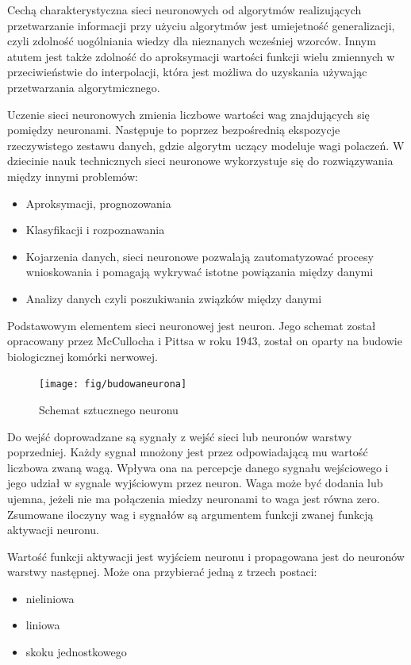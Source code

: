 \documentclass[brudnopis]{xmgr}
\begin{document}
Cechą charakterystyczna sieci neuronowych od algorytmów realizujących przetwarzanie informacji przy użyciu algorytmów jest umiejetność generalizacji, czyli zdolność uogólniania wiedzy dla nieznanych wcześniej wzorców. Innym atutem jest także zdolność do aproksymacji wartości funkcji wielu zmiennych w przeciwieństwie do interpolacji, która jest możliwa do uzyskania używając przetwarzania algorytmicznego.

Uczenie sieci neuronowych zmienia liczbowe wartości wag znajdujących się pomiędzy neuronami. Następuje to poprzez bezpośrednią ekspozycje rzeczywistego zestawu danych, gdzie algorytm uczący modeluje wagi polaczeń. W dziecinie nauk technicznych sieci neuronowe wykorzystuje się do rozwiązywania między innymi problemów:

\begin{itemize}
\item
Aproksymacji, prognozowania
\item
Klasyfikacji i rozpoznawania
\item
Kojarzenia danych, sieci neuronowe pozwalają zautomatyzować procesy wnioskowania i pomagają wykrywać istotne powiązania między danymi
\item
Analizy danych czyli poszukiwania związków między danymi
\end{itemize}

Podstawowym elementem sieci neuronowej jest neuron. Jego schemat został opracowany przez McCullocha i Pittsa w roku 1943, został on oparty na budowie biologicznej komórki nerwowej.

\begin{figure}[!tbh]
\centering
\texttt{[image: fig/budowaneurona]}
\caption{Schemat sztucznego neuronu}
\end{figure}
\newpage

Do wejść doprowadzane są sygnały z wejść sieci lub neuronów warstwy poprzedniej. Każdy sygnał mnożony jest przez odpowiadającą mu wartość liczbowa zwaną wagą. Wpływa ona na percepcje danego sygnału wejściowego i jego udział w sygnale wyjściowym przez neuron. Waga może być dodania lub ujemna, jeżeli nie ma połączenia miedzy neuronami to waga jest równa zero. Zsumowane iloczyny wag i sygnałów są argumentem funkcji zwanej funkcją aktywacji neuronu.

Wartość funkcji aktywacji jest wyjściem neuronu i propagowana jest do neuronów warstwy następnej. Może ona przybierać jedną z trzech postaci:
\begin{itemize}
\item
nieliniowa
\item
liniowa
\item
skoku jednostkowego
\end{itemize}
\end{document}
